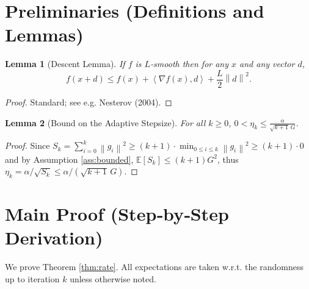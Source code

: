 \documentclass[11pt]{article}
\newtheorem{lemma}{Lemma}
\newcommand{\EE}{\mathbb{E}}
\newcommand{\norm}[1]{\left\|#1\right\|}
\newcommand{\inner}[2]{\left\langle #1,#2 \right\rangle}
\begin{document}
\newpage
\section*{Preliminaries (Definitions and Lemmas)}
\begin{lemma}[Descent Lemma]\label{lem:descent}
If $f$ is $L$‑smooth then for any $x$ and any vector $d$,
\[
f(x+d)\le f(x)+\inner{\nabla f(x)}{d}+\frac{L}{2}\norm{d}^2 .
\]
\end{lemma}
\begin{proof}
Standard; see e.g. Nesterov (2004). \qedhere
\end{proof}

\begin{lemma}[Bound on the Adaptive Stepsize]\label{lem:stepsize}
For all $k\ge0$, $\displaystyle 0<\eta_k\le\frac{\alpha}{\sqrt{k+1}\,G}$.
\end{lemma}
\begin{proof}
Since $S_k=\sum_{i=0}^{k}\norm{g_i}^2\ge (k+1) \cdot \min_{0\le i\le k}\norm{g_i}^2\ge (k+1) \cdot 0$ and by Assumption \ref{ass:bounded},
$\EE[S_k]\le (k+1)G^2$, thus $\eta_k=\alpha/\sqrt{S_k}\le\alpha/(\sqrt{k+1}\,G)$. \qedhere
\end{proof}

\section*{Main Proof (Step‑by‑Step Derivation)}
We prove Theorem \ref{thm:rate}. All expectations are taken w.r.t. the randomness up to iteration $k$ unless otherwise noted.
\end{document}
